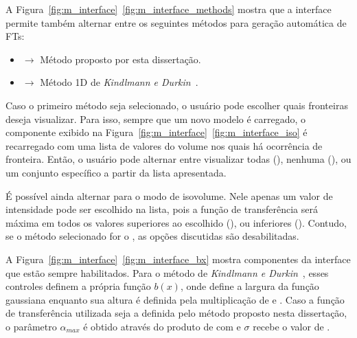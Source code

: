 	A Figura~\ref{fig:m_interface}~\ref{fig:m_interface_methods} mostra que a interface permite também alternar entre os seguintes métodos para geração automática de FTs:
	\begin{itemize}
		\item {} $ \rightarrow $ Método proposto por esta dissertação.
		\item {} $ \rightarrow $ Método 1D de \textit{Kindlmann e Durkin}~\cite{gordon}.
	\end{itemize}
	
	Caso o primeiro método seja selecionado, o usuário pode escolher quais fronteiras deseja visualizar. Para isso, sempre que um novo modelo é carregado, o componente exibido na Figura~\ref{fig:m_interface}~\ref{fig:m_interface_iso} é recarregado com uma lista de valores do volume nos quais há ocorrência de fronteira. Então, o usuário pode alternar entre visualizar todas (), nenhuma (), ou um conjunto específico a partir da lista apresentada.
	
	É possível ainda alternar para o modo de isovolume. Nele apenas um valor de intensidade pode ser escolhido na lista, pois a função de transferência será máxima em todos os valores superiores ao escolhido (), ou inferiores (). Contudo, se o método selecionado for o , as opções discutidas são desabilitadas.
	
	A Figura~\ref{fig:m_interface}~\ref{fig:m_interface_bx} mostra componentes da interface que estão sempre habilitados. Para o método de \textit{Kindlmann e Durkin}~\cite{gordon}, esses controles definem a própria função $ b(x) $, onde  define a largura da função gaussiana enquanto sua altura é definida pela multiplicação de  e . Caso a função de transferência utilizada seja a definida pelo método proposto nesta dissertação, o parâmetro $ \alpha_{max} $ é obtido através do produto de  com  e $ \sigma $ recebe o valor de .
	
